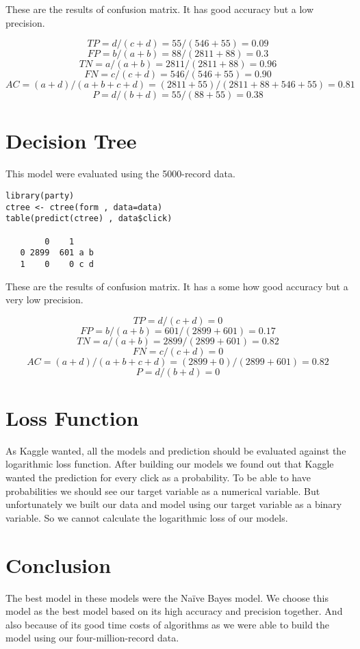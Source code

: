 \documentclass[11pt,a4paper]{article}
\begin{document}
These are the results of confusion matrix. It has good
accuracy but a low precision.

$$TP = d / (c+d) = 55 / (546 + 55) = 0.09$$
$$FP = b / (a+b) = 88/(2811+88)=0.3$$
$$TN = a / (a+b) = 2811/(2811+88)=0.96$$
$$FN = c / (c+d) = 546/(546+55)=0.90$$
$$AC=(a+d)/(a+b+c+d) = (2811+55) / (2811+88+546+55) = 0.81$$
$$P = d / (b+d) = 55 / (88 + 55) = 0.38$$

\section{Decision Tree}
\label{sec-7}
This model were evaluated using the 5000-record data.

\begin{verbatim}
library(party)
ctree <- ctree(form , data=data)
table(predict(ctree) , data$click)

        0    1
   0 2899  601 a b
   1    0    0 c d
\end{verbatim}

These are the results of confusion matrix. It has a some how
good accuracy but a very low precision.

$$TP = d / (c+d) =  0$$
$$FP = b / (a+b) = 601 / (2899+601) = 0.17$$
$$TN = a / (a+b) = 2899 / (2899+601)=0.82 $$
$$FN = c / (c+d) = 0$$
$$AC=(a+d)/(a+b+c+d) = (2899+0)/(2899+601)=0.82$$
$$P = d / (b+d) = 0$$

\section{Loss Function}
\label{sec-8}
As Kaggle wanted, all the models and prediction should be evaluated against
the logarithmic loss function. After building our models we found out
that Kaggle wanted the prediction for every click as a probability. To be able to
have probabilities we should see our target variable as a numerical variable. But unfortunately
we built our data and model using our target variable as a binary variable. So we cannot 
calculate the logarithmic loss of our models.

\section{Conclusion}
\label{sec-9}
The best model in these models were the Naïve Bayes model.
We choose this model as the best model based on its high accuracy and 
precision together. And also because of its good time costs of algorithms 
as we were able to build the model using our four-million-record data.
\end{document}
